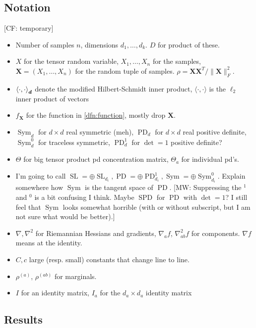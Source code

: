 \documentclass{article}
\renewcommand{\vec}{\bm}
\newcommand\SL{\operatorname{SL}}
\newcommand\PD{\operatorname{PD}}
\newcommand\Sym{\operatorname{Sym}}
\newcommand{\CF}[1]{{\color{purple}[CF: #1]}}
\newcommand{\MW}[1]{{\color{red}[MW: #1]}}
\begin{document}
\subsection{Notation}
\CF{temporary}
\begin{itemize}
\item Number of samples $n$, dimensions $d_1, \dots, d_k$. $D$ for product of these.
\item $X$ for the tensor random variable, $X_1, \dots, X_n$ for the samples, $\vec X = (X_1, \dots, X_n)$ for the random tuple of samples.
$\rho = \vec X \vec X^T/\|\vec X\|_F^2$.
\item $\braket{\cdot,\cdot}_{\vec d}$ denote the modified Hilbert-Schmidt inner product,
$\langle \cdot, \cdot \rangle$ is the $\ell_2$ inner product of vectors
\item $f_{\vec X}$ for the function in \cref{dfn:function}, mostly drop $\vec X$.
\item $\Sym_d$ for $d \times d$ real symmetric (meh), $\PD_d$ for $d \times d$ real positive definite, $\Sym_d^0$ for traceless symmetric, $\PD_d^1$ for $\det=1$ positive definite?
\item $\Theta$ for big tensor product pd concentration matrix, $\Theta_a$ for individual pd's.
\item I'm going to call $\SL = \oplus \SL_{d_i}, \PD = \oplus \PD_{d_i}^1, \Sym = \oplus \Sym_{d_i}^0$. Explain somewhere how $\Sym$ is the tangent space of $\PD$. \MW{Suppressing the $^1$ and $^0$ is a bit confusing I think. Maybe $\operatorname{SPD}$ for $\PD$ with $\det=1$? I still feel that $\Sym$ looks somewhat horrible (with or without subscript, but I am not sure what would be better).}
\item $\nabla, \nabla^2$ for Riemannian Hessians and gradients, $\nabla_a f$, $\nabla^2_{ab} f$ for components. $\nabla f$ means at the identity.
\item $C, c$ large (resp. small) constants that change line to line.
\item $\rho^{(a)}$, $\rho^{(ab)}$ for marginals.
\item $I$ for an identity matrix, $I_a$ for the $d_a \times d_a$ identity matrix
\end{itemize}

\subsection{Results}
\end{document}
